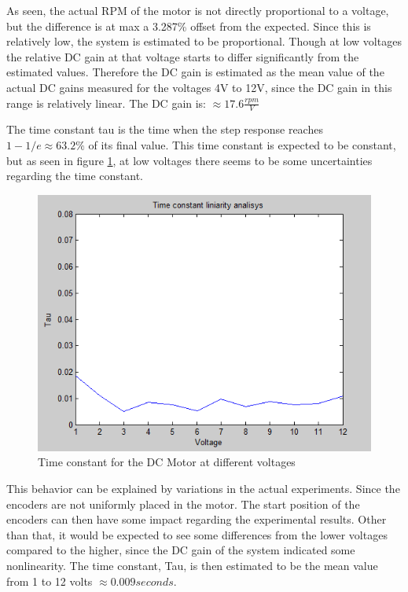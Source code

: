As seen, the actual RPM of the motor is not directly proportional to a voltage, but the difference is at max a 3.287\% offset from the expected. Since this is relatively low, the system is estimated to be proportional. Though at low voltages the relative DC gain at that voltage starts to differ significantly from the estimated values. Therefore the DC gain is estimated as the mean value of the actual DC gains measured for the voltages 4V to 12V, since the DC gain in this range is relatively linear. The DC gain is: $\approx 17.6\frac{rpm}{V}$

The time constant tau is the time when the step response reaches $1-1/e\approx63.2\%$ of its final value. This time constant is expected to be constant, but as seen in figure \ref{fig:TimeConstantLinearityAnalysis}, at low voltages there seems to be some uncertainties regarding the time constant.

\begin{figure}[h!]
\centering
\includegraphics[scale=0.5]{Billeder/TimeConstantLinearityAnalysis.png}
\caption{Time constant for the DC Motor at different voltages}
\label{fig:TimeConstantLinearityAnalysis}
\end{figure}

This behavior can be explained by variations in the actual experiments. Since the encoders are not uniformly placed in the motor. The start position of the encoders can then have some impact regarding the experimental results. Other than that, it would be expected to see some differences from the lower voltages compared to the higher, since the DC gain of the system indicated some nonlinearity. The time constant, Tau, is then estimated to be the mean value from 1 to 12 volts $\approx 0.009 seconds$.

